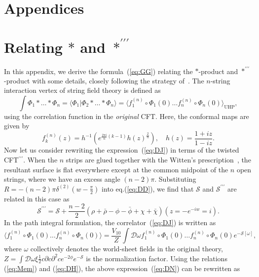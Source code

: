 \documentclass[a4paper,12pt]{article}
\newcommand{\cD}{\mathcal{D}}
\newcommand{\cS}{\mathcal{S}}
\newcommand{\tp}{\prime\prime\prime}
\newcommand{\sectiono}[1]{\section{#1}\setcounter{equation}{0}}
\begin{document}

\section*{Appendices}
\renewcommand{\thesection}{\Alph{section}}
\setcounter{section}{0}

\sectiono{Relating $*$ and $*^{\tp}$}\label{sec:appA}
In this appendix, we derive the formula~(\ref{eq:GG}) relating the $*$-product and $*^{\tp}$-product 
with some details, closely following the strategy of~\cite{GRSZ1}. The $n$-string interaction vertex of 
string field theory is defined as~\cite{Witten,LPP}
\begin{equation}
\int\Phi_1*\ldots *\Phi_n=\langle\Phi_1|\Phi_2*\ldots *\Phi_n\rangle=\langle f^{(n)}_1\circ\Phi_1(0)
\ldots f^{(n)}_n\circ\Phi_n(0)\rangle_{\mathrm{UHP}}, \label{eq:DJ}
\end{equation}
using the correlation function in the \textit{original} CFT. Here, the conformal maps are 
given by 
\begin{equation}
f^{(n)}_k(z)=h^{-1}\left(e^{\frac{2\pi i}{n}(k-1)}h(z)^{\frac{2}{n}}\right), \quad  
h(z)=\frac{1+iz}{1-iz}. \label{eq:DK}
\end{equation}
Now let us consider rewriting the expression~(\ref{eq:DJ}) in terms of the twisted CFT$^{\tp}$. 
When the $n$ strips are glued together with the Witten's prescription~\cite{Witten}, the resultant 
surface is flat everywhere except at the common midpoint of the $n$ open strings, where we have an 
excess angle $(n-2)\pi$. Substituting $R=-(n-2)\pi\delta^{(2)}(w-\frac{\pi}{2})$ into eq.(\ref{eq:DD}), 
we find that $\cS$ and $\cS^{\tp}$ are related in this case as 
\begin{equation}
\cS^{\tp}=\cS+\frac{n-2}{2}(\rho+\bar{\rho}-\phi-\bar{\phi}+\chi+\bar{\chi})(z=-e^{-iw}=i). \label{eq:Mem}
\end{equation}
In the path integral formulation, the correlator~(\ref{eq:DJ}) 
is written as 
\begin{equation}
\langle f^{(n)}_1\circ\Phi_1(0)\ldots f^{(n)}_n\circ\Phi_n(0)\rangle=\frac{V_{10}}{Z}\int\cD\omega
f^{(n)}_1\circ\Phi_1(0)\ldots f^{(n)}_n\circ\Phi_n(0)e^{-\cS[\omega]}, \label{eq:DN}
\end{equation}
where $\omega$ collectively denotes the world-sheet fields in the original theory, \\
$Z=\int\cD\omega\xi\frac{1}{2}c\partial c\partial^2ce^{-2\phi}e^{-\cS}$ is the normalization 
factor. Using the relations (\ref{eq:Mem}) 
and (\ref{eq:DH}), the above expression~(\ref{eq:DN}) can be rewritten as 
\end{document}
